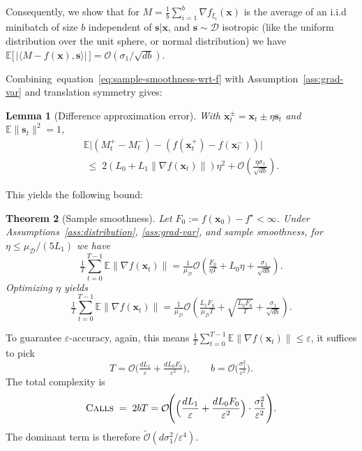 \documentclass[twoside]{article}
\theoremstyle{plain}
\newtheorem{lemma}{Lemma}[section]
\newtheorem{theorem}[lemma]{Theorem}
\theoremstyle{definition}
\theoremstyle{remark}
\def\eqref#1{equation~\ref{#1}}
\def\cO{{\mathcal{O}}}
\def\vs{{\bm{s}}}
\def\vx{{\bm{x}}}
\def\O{{\mathcal{O}}}
\newcommand{\E}{\mathbb{E}}
\begin{document}
Consequently, we show that for $M = \frac{1}{b}\sum_{i=1}^b \nabla f_{\xi_i}(\vx)$ is the average of an i.i.d minibatch of size $b$ independent of $\vs|\vx$, and $\vs\sim\mathcal{D}$ isotropic (like the uniform distribution over the unit sphere, or normal distribution) we have
\(
    \E\big[\,|\langle M - f(\vx),\vs\rangle|\,\big] =\cO\left( \sigma_1 / \sqrt{d b}\right).
\)

Combining~\eqref{eq:sample-smoothness-wrt-f} with
Assumption~\ref{ass:grad-var} and translation symmetry gives:

\begin{lemma}[Difference approximation error]
\label{lem:diff-error}
With $\vx_t^\pm=\vx_t\pm\eta\vs_t$ and $\E\|\vs_t\|^2=1$,
\begin{multline*}
    \E\big|(M_t^+-M_t^-) - (f(\vx_t^+)-f(\vx_t^-))\big|
   \\\;\le\; 2(L_0+L_1\|\nabla f(\vx_t)\|)\eta^2
   + \cO\!\left(\tfrac{\eta\sigma_1}{\sqrt{db}}\right).
\end{multline*}
\end{lemma}

This yields the following bound:

\begin{theorem}[Sample smoothness]
\label{thm:avg-caseII}
Let $F_0:=f(\vx_0)-f^\star<\infty$. Under
Assumptions~\ref{ass:distribution}, \ref{ass:grad-var}, and sample smoothness,
for $\eta\le \mu_{\mathcal{D}}/(5L_1)$ we have
\[
   \tfrac{1}{T}\sum_{t=0}^{T-1}\E\|\nabla f(\vx_t)\|
   = \tfrac{1}{\mu_{\mathcal{D}}}
   \cO\!\left(\tfrac{F_0}{\eta T}+L_0\eta+\tfrac{\sigma_1}{\sqrt{db}}\right).
\]
Optimizing $\eta$ yields
\[
   \tfrac{1}{T}\sum_{t=0}^{T-1}\E\|\nabla f(\vx_t)\|
   = \tfrac{1}{\mu_{\mathcal{D}}}
   \cO\!\left(\tfrac{L_1F_0}{\mu_{\mathcal{D}}T} +
   \sqrt{\tfrac{L_0F_0}{T}} + \tfrac{\sigma_1}{\sqrt{db}}\right).
\]
\end{theorem}

To guarantee $\varepsilon$-accuracy, again, this means $\frac{1}{T}\sum_{t=0}^{T-1}\E\|\nabla f(\vx_t)\| \leq \varepsilon$, it suffices to pick
\[
   T = \O\!\Big(\tfrac{dL_1}{\varepsilon} + \tfrac{dL_0F_0}{\varepsilon^2}\Big),
   \qquad
   b = \O\!\Big(\tfrac{\sigma_1^2}{\varepsilon^2}\Big).
\]
The total complexity is
\[
    \textsc{Calls} \;=\; 2bT
    = \O\!\Bigg(
        \Big(\frac{dL_1}{\varepsilon}
            + \frac{dL_0F_0}{\varepsilon^2}\Big)
        \cdot
        \frac{\sigma_1^2}{\varepsilon^2}
    \Bigg).
\]
The dominant term is therefore
\(\tilde{\cO}(d\sigma_1^2/\varepsilon^4)\).
\end{document}
